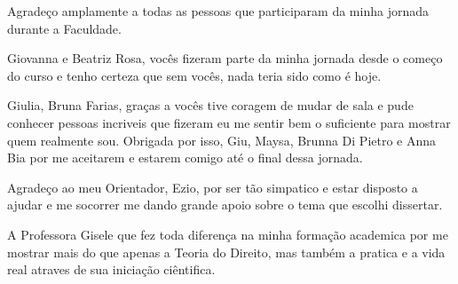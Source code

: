 \begin{agradecimentos}

Agradeço amplamente a todas as pessoas que participaram da minha jornada durante a Faculdade. 

Giovanna e Beatriz Rosa, vocês fizeram parte da minha jornada desde o começo do curso e tenho certeza que sem vocês, nada teria sido como é hoje. 

Giulia, Bruna Farias, graças a vocês tive coragem de mudar de sala e pude conhecer pessoas incriveis que fizeram eu me sentir bem o suficiente para mostrar quem realmente sou. Obrigada por isso, Giu, Maysa, Brunna Di Pietro e Anna Bia por me aceitarem e estarem comigo até o final dessa jornada. 

Agradeço ao meu Orientador, Ezio, por ser tão simpatico e estar disposto a ajudar e me socorrer me dando grande apoio sobre o tema que escolhi dissertar. 

A Professora Gisele que fez toda diferença na minha formação academica por me mostrar mais do que apenas a Teoria do Direito, mas também a pratica e a vida real atraves de sua iniciação ciêntifica. 


\end{agradecimentos}
